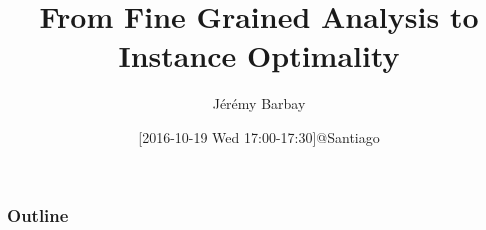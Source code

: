 \documentclass{beamer}
\title[Instance Optimality] 
{From Fine Grained Analysis to Instance Optimality}
\author{J{\'e}r{\'e}my Barbay}
\institute
{
  jeremy@barbay.cl
}
\date{[2016-10-19 Wed 17:00-17:30]@Santiago}
\begin{document}
\begin{frame}
  \titlepage
\end{frame}

\begin{frame}
  \frametitle{Outline}
  \tableofcontents
\end{frame}


\end{document}
